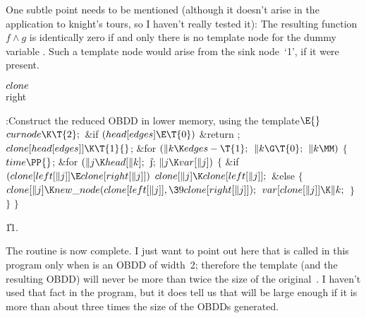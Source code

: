 One subtle point needs to be mentioned (although it doesn't arise in the
application to knight's tours, so I haven't really tested it): The resulting
function $f\land g$ is identically zero if and only there is no template
node for the dummy variable . Such a template node would arise
from the sink node~`1', if it were present.

\Y\B\4\D$\\{clone}$ \5
\\{right}\par
\Y\B\4:Construct the reduced OBDD in lower memory, using the template\X${}%
\E{}$\6
$\\{curnode}\K\T{2};{}$\6
\&{if} ${}(\\{head}[\\{edges}]\E\T{0}){}$\1\5
\&{return} ;\2\6
${}\\{clone}[\\{head}[\\{edges}]]\K\T{1}{}$;\6
\&{for} ${}(\|k\K\\{edges}-\T{1};{}$ ${}\|k\G\T{0};{}$ ${}\|k\MM){}$\5
${}\{{}$\1\6
${}\\{time}\PP{}$;\6
\&{for} ${}(\|j\K\\{head}[\|k];{}$ \|j; ${}\|j\K\\{var}[\|j]){}$\5
${}\{{}$\1\6
\&{if} ${}(\\{clone}[\\{left}[\|j]]\E\\{clone}[\\{right}[\|j]]){}$\1\5
${}\\{clone}[\|j]\K\\{clone}[\\{left}[\|j]];{}$\2\6
\&{else}\5
${}\{{}$\1\6
${}\\{clone}[\|j]\K\\{new\_node}(\\{clone}[\\{left}[\|j]],\39\\{clone}[%
\\{right}[\|j]]);{}$\6
${}\\{var}[\\{clone}[\|j]]\K\|k;{}$\6
\4${}\}{}$\2\6
\4${}\}{}$\2\6
\4${}\}{}$\2\par
\U11.\fi

The  routine is now complete. I just want to point out
here that
 is called in this program only when  is
an OBDD of
width~2; therefore the template (and the resulting OBDD)
will never be more than twice the size of the original~.
I haven't used that fact in the program, but it does tell
us that  will be large enough if it is more than about three
times
the size of the OBDDs generated.

